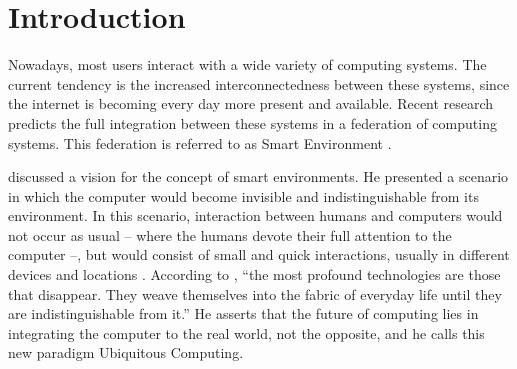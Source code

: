 \documentclass{svjour3}                     %
\begin{document}
\begin{abstract}
Context-aware and ubiquitous systems have the challenge of implicitly collect relevant information about entities, and use this information to understand and predict their behaviour. This allows the applications to adapt themselves to the entities, thus avoiding to overflow them with inquires and information. The analysis of trails, the context-aware history of actions, can further improve the relevance of information. This paper proposes a model that allows applications to register entities' actions in trails and infer profile information from these trails, using semantic interoperability and thus allowing different applications to share information and infer a unified profile. A prototype was developed for the evaluation of the model, and it was integrated with two different softwares. It was verified that was possible to enrich the profile generation of applications through the integration with the model. The contributions of this model are the use of trails for extracting profiles and the capability of managing dynamic inference rules for profile generation.
\end{abstract}


\section{Introduction}
\label{ch:introducao}

Nowadays, most users interact with a wide variety of computing systems. The current tendency is the increased interconnectedness between these systems, since the internet is becoming every day more present and available. Recent research predicts the full integration between these systems in a federation of computing systems. This federation is referred to as Smart Environment \citep{heckmann05,todo}.

\citet{weiser91} discussed a vision for the concept of smart environments. He
presented a scenario in which the computer would become invisible and
indistinguishable from its environment. In this scenario, interaction between
humans and computers would not occur as usual -- where the humans devote their
full attention to the computer --, but would consist of small and quick
interactions, usually in different devices and locations \citep{weiser96}.
According to \citet{weiser91}, ``the most profound technologies are those that
disappear. They weave themselves into the fabric of everyday life until they
are indistinguishable from it.'' He asserts that the future
of computing lies in integrating the computer to the real world, not the
opposite, and he calls this new paradigm Ubiquitous Computing.
\end{document}

